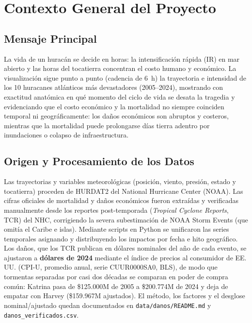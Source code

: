 \documentclass[11pt,a4paper]{article}
\begin{document}
	\vspace{0.2cm}
	
	\section{Contexto General del Proyecto}
	
	\subsection{Mensaje Principal}
	La vida de un huracán se decide en horas: la intensificación rápida (IR) en mar abierto y las horas del tocatierra concentran el costo humano y económico. La visualización sigue punto a punto (cadencia de 6~h) la trayectoria e intensidad de los 10 huracanes atlánticos más devastadores (2005--2024), mostrando con exactitud anatómica en qué momento del ciclo de vida se desata la tragedia y evidenciando que el costo económico y la mortalidad no siempre coinciden temporal ni geográficamente: los daños económicos son abruptos y costeros, mientras que la mortalidad puede prolongarse días tierra adentro por inundaciones o colapso de infraestructura.
	
	\subsection{Origen y Procesamiento de los Datos}
	Las trayectorias y variables meteorológicas (posición, viento, presión, estado y tocatierra) proceden de HURDAT2 del National Hurricane Center (NOAA). Las cifras oficiales de mortalidad y daños económicos fueron extraídas y verificadas manualmente desde los reportes post-temporada (\textit{Tropical Cyclone Reports}, TCR) del NHC, corrigiendo la severa subestimación de NOAA Storm Events (que omitía el Caribe e islas). Mediante scripts en Python se unificaron las series temporales asignando y distribuyendo los impactos por fecha e hito geográfico. Los daños, que los TCR publican en dólares nominales del año de cada evento, se ajustaron a \textbf{dólares de 2024} mediante el índice de precios al consumidor de EE.\,UU. (CPI-U, promedio anual, serie CUUR0000SA0, BLS), de modo que tormentas separadas por casi dos décadas se comparan en poder de compra común: Katrina pasa de \$125.000M de 2005 a \$200.774M de 2024 y deja de empatar con Harvey (\$159.967M ajustados). El método, los factores y el desglose nominal/ajustado quedan documentados en \texttt{data/danos/README.md} y \texttt{danos\_verificados.csv}.
	
\end{document}
